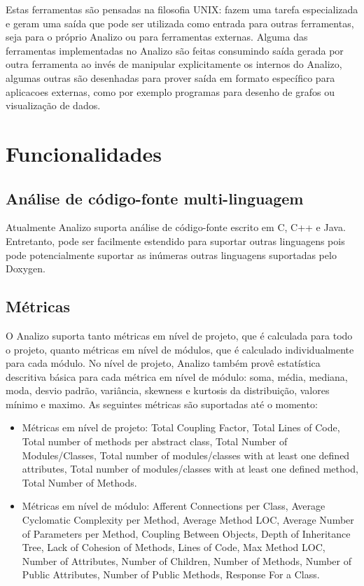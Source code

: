 \documentclass{article}
\begin{document}
Estas ferramentas são pensadas na filosofia UNIX: fazem uma tarefa
especializada e geram uma saída que pode ser utilizada como entrada para outras
ferramentas, seja para o próprio Analizo ou para ferramentas externas. Alguma das
ferramentas implementadas no Analizo são feitas consumindo saída gerada por
outra ferramenta ao invés de manipular explicitamente os internos do Analizo,
algumas outras são desenhadas para prover saída em formato específico para
aplicacoes externas, como por exemplo programas para desenho de grafos ou
visualização de dados.

\section{Funcionalidades}\label{funcionalidades}

\subsection{Análise de código-fonte multi-linguagem}

Atualmente Analizo suporta análise de código-fonte escrito em C, C++ e Java.
Entretanto, pode ser facilmente estendido para suportar outras linguagens pois
pode potencialmente suportar as inúmeras outras linguagens suportadas pelo Doxygen.

\subsection{Métricas}\label{metricas}

O Analizo suporta tanto métricas em nível de projeto, que é calculada para todo o projeto,
quanto métricas em nível de módulos, que é calculado individualmente para cada módulo.
No nível de projeto, Analizo também provê estatística descritiva básica para cada métrica em
nível de módulo: soma, média, mediana, moda, desvio padrão, variância, skewness e kurtosis da
distribuição, valores mínimo e maximo. As seguintes métricas são suportadas até o momento:

\begin{itemize}

  \item Métricas em nível de projeto: Total Coupling Factor, Total Lines of
  Code, Total number of methods per abstract class, Total Number of
  Modules/Classes, Total number of modules/classes with at least one defined
  attributes, Total number of modules/classes with at least one defined method,
  Total Number of Methods.

  \item Métricas em nível de módulo: Afferent Connections per Class, Average
  Cyclomatic Complexity per Method, Average Method LOC, Average Number of
  Parameters per Method, Coupling Between Objects, Depth of Inheritance Tree,
  Lack of Cohesion of Methods, Lines of Code, Max Method LOC, Number of
  Attributes, Number of Children, Number of Methods, Number of Public
  Attributes, Number of Public Methods, Response For a Class.

\end{itemize}
\end{document}
